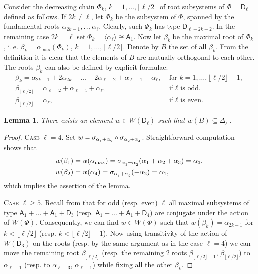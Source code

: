 \documentclass[11pt]{amsart}
\theoremstyle{plain}
\numberwithin{equation}{section}
\newtheorem{lemma}{Lemma}
\numberwithin{lemma}{section}
\theoremstyle{definition}
\theoremstyle{remark}
\newcommand{\rA}{\mathsf{A}}
\newcommand{\rD}{\mathsf{D}}
\def\ssub#1{\mathchoice
   {_{\lower2pt\hbox{$\scriptstyle #1$}}}
   {_{\lower2pt\hbox{$\scriptstyle #1$}}}
   {_{\lower1.5pt\hbox{$\scriptscriptstyle #1$}}}
   {_{\!\lower1.5pt\hbox{$\scriptscriptstyle #1$}}}}
\begin{document}
Consider the decreasing chain $\Phi_k$, $k=1, \ldots, \lfloor \ell/2 \rfloor$ of root subsystems of $\Phi=\rD_\ell$ defined as follows.
If $2k \neq \ell$, let $\Phi_k$ be the subsystem of $\Phi$, spanned by the fundamental roots $\alpha_{2k-1}, \ldots, \alpha_\ell$.
Clearly, such $\Phi_k$ has type $\rD_{\ell-2k+2}$. 
In the remaining case $2k = \ell$ set $\Phi_k = \langle \alpha_\ell \rangle \cong \rA_1$.
Now let $\beta_k$ be the maximal root of $\Phi_k$, i.\,e. $\beta_k = \alpha_\mathrm{max}(\Phi_k)$, $k=1, \ldots, \lfloor \ell/2 \rfloor$.
Denote by $B$ the set of all $\beta_k$. From the definition it is clear that the elements of $B$ are mutually orthogonal to each other.
The roots $\beta_k$ can also be defined by explicit formulae:
\begin{align*}
 \beta_k =  \alpha_{2k-1} + 2\alpha_{2k}+ \ldots + 2\alpha_{\ell-2} + \alpha_{\ell-1} + \alpha_\ell, & \text{ for } k=1, \ldots, \lfloor\ell/2\rfloor-1, \\
 \beta_{\lfloor\ell/2\rfloor} = \alpha_{\ell-2}+\alpha_{\ell-1}+\alpha_\ell, & \text{ if $\ell$ is odd, } \\
 \beta_{\lfloor\ell/2\rfloor} = \alpha_\ell, & \text{ if $\ell$ is even.}
\end{align*}

\begin{lemma}\label{lemma:nikolov-weyl} There exists an element $w\in W(\rD_\ell)$ such that $w(B) \subseteq \Delta_\ell^+$. \end{lemma}
\begin{proof}
\textsc{Case $\ell=4$.} Set $w = \sigma_{\alpha\ssub{1} + \alpha\ssub{2}} \circ \sigma_{\alpha\ssub{2} + \alpha\ssub{4}}$.
Straightforward computation shows that 
\begin{align*}
& w(\beta_1) = w(\alpha_\mathrm{max}) = \sigma_{\alpha\ssub{1} + \alpha\ssub{2}}(\alpha_1 + \alpha_2 + \alpha_3) = \alpha_3, \\
& w(\beta_2) = w(\alpha_4) = \sigma_{\alpha\ssub{1} + \alpha\ssub{2}}(- \alpha_2) = \alpha_1,
\end{align*}
which implies the assertion of the lemma.

\textsc{Case $\ell \geq 5$.}
Recall from \cite[Table~9]{Dy72} that for odd (resp. even) $\ell$ all maximal subsystems of type $\rA_1+\ldots+\rA_1+\rD_3$
(resp. $\rA_1+\ldots+\rA_1+\rD_4$) are conjugate under the action of $W(\Phi)$. Consequently, we can find $w\in W(\Phi)$
such that $w(\beta_k) = \alpha_{2k-1}$ for $k < \lfloor\ell/2\rfloor$ (resp. $k < \lfloor\ell/2\rfloor-1$). 
Now using transitivity of the action of $W(\rD_3)$ on the roots (resp. by the same argument as in the case $\ell=4$) we can move the remaining root $\beta_{\lfloor\ell/2\rfloor}$ 
(resp. the remaining $2$ roots $\beta_{\lfloor\ell/2\rfloor-1}$, $\beta_{\lfloor\ell/2\rfloor}$) to
$\alpha_{\ell-1}$ (resp. to $\alpha_{\ell-3}$, $\alpha_{\ell-1}$) while fixing all the other $\beta_k$. \end{proof}
\end{document}
